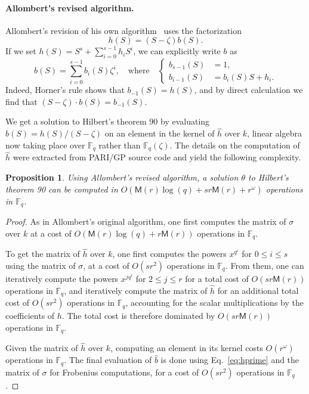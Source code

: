 \documentclass{mcom-l}
\theoremstyle{plain}
\newtheorem{proposition}[theorem]{Proposition}
\theoremstyle{definition}
\newcommand{\F}{\ensuremath{\mathbb{F}}}
\newcommand{\MM}{\ensuremath{\mathsf{M}}}
\newcounter{algorithm}
\begin{document}
\paragraph{\bf Allombert's revised algorithm.}
Allombert's revision of his own algorithm~\cite{Allombert02-rev} uses
the factorization
\begin{equation}
  \label{eq:allomb-b}
  h(S)=(S-\zeta) b(S).
\end{equation}
If we set $h(S)=S^s+\sum_{i=0}^{s-1}h_iS^i$, we can
explicitly write $b$ as
\begin{equation}
  \label{eq:hprime}
  b(S)=\sum_{i=0}^{s-1}b_i(S)\zeta^i,\quad
  \text{where}\quad
  \left\{\begin{aligned}
    b_{s-1}(S) &= 1,\\
    b_{i-1}(S) &= b_i(S) S + h_i.
  \end{aligned}\right.
\end{equation}
Indeed, Horner's rule shows that $b_{-1}(S)=h(S)$, and by direct
calculation we find that $(S-\zeta)\cdot b(S) = b_{-1}(S)$.

We get a solution to Hilbert's theorem 90 by evaluating
$b(S)=h(S)/(S-\zeta)$ on an element in the kernel of $\hat{h}$ over
$k$, linear algebra now taking place over $\F_q$ rather than
$\F_q(\zeta)$. The details on the computation of $\hat{h}$ were
extracted from PARI/GP source code and yield the following complexity.

\begin{proposition}
  Using Allombert's revised algorithm, a solution $\theta$ to
  Hilbert's theorem 90 can be computed in $O(\MM(r) \log(q) + s r
  \MM(r) + r^\omega)$ operations in $\F_q$.
\end{proposition}

\begin{proof}
As in Allombert's original algorithm, one first
computes the matrix of $\sigma$ over $k$ at a cost of
$O(\MM(r) \log(q) + r \MM(r))$ operations in $\F_q$.


To get the matrix of $\hat{h}$ over $k$, one first computes the powers
$x^{q^i}$ for $0 \leq i \leq s$ using the matrix of $\sigma$, at a
cost of $O(s r^2)$ operations in $\F_q$.  From them, one can
iteratively compute the powers $x^{j q^i}$ for $2 \leq j \leq r$ for a
total cost of $O(s r \MM(r))$ operations in $\F_q$, and iteratively
compute the matrix of $\hat{h}$ for an additional total cost of $O(s
r^2)$ operations in $\F_q$, accounting for the scalar multiplications
by the coefficients of $h$.  The total cost is therefore dominated by
$O(s r \MM(r))$ operations in $\F_q$.

Given the matrix of $\hat{h}$ over $k$, computing an element in its
kernel costs $O(r^\omega)$ operations in $\F_q$.  The final evaluation
of $\hat{b}$ is done using Eq.~\eqref{eq:hprime} and the matrix of
$\sigma$ for Frobenius computations, for a cost of $O(s r^2)$ operations
in $\F_q$.
\end{proof}
\end{document}
